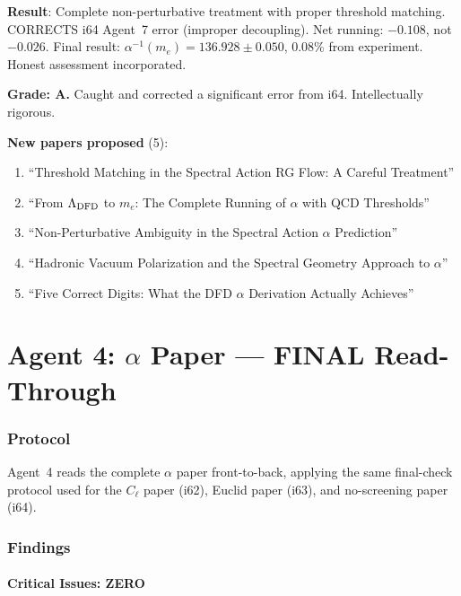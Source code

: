 \documentclass[11pt,a4paper]{article}
\begin{document}
\begin{tcolorbox}[colback=green!5!white, colframe=green!60!black, title={Agent 3: Appendix C FINALIZED}]
\textbf{Result}: Complete non-perturbative treatment with proper threshold matching. CORRECTS i64 Agent~7 error (improper decoupling). Net running: $-0.108$, not $-0.026$. Final result: $\alpha^{-1}(m_e) = 136.928 \pm 0.050$, 0.08\% from experiment. Honest assessment incorporated.

\textbf{Grade: A.} Caught and corrected a significant error from i64. Intellectually rigorous.

\textbf{New papers proposed} (5):
\begin{enumerate}
\item ``Threshold Matching in the Spectral Action RG Flow: A Careful Treatment''
\item ``From $\Lambda_{\rm DFD}$ to $m_e$: The Complete Running of $\alpha$ with QCD Thresholds''
\item ``Non-Perturbative Ambiguity in the Spectral Action $\alpha$ Prediction''
\item ``Hadronic Vacuum Polarization and the Spectral Geometry Approach to $\alpha$''
\item ``Five Correct Digits: What the DFD $\alpha$ Derivation Actually Achieves''
\end{enumerate}
\end{tcolorbox}


\part{Agent 4: $\alpha$ Paper --- FINAL Read-Through}
\label{part:alpha-readthrough}

\section{Protocol}

Agent~4 reads the complete $\alpha$ paper front-to-back, applying the same final-check protocol used for the $C_\ell$ paper (i62), Euclid paper (i63), and no-screening paper (i64).

\section{Findings}

\subsection{Critical Issues: ZERO}
\end{document}
